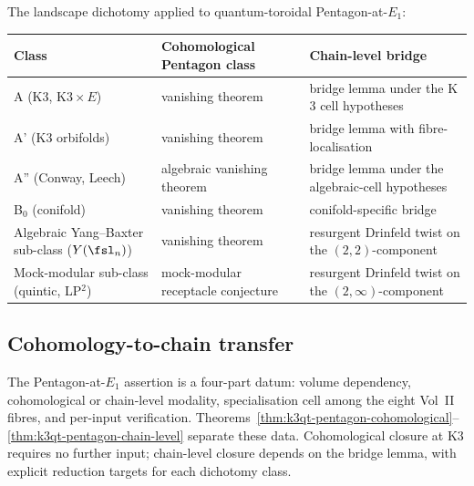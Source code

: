 \begin{remark}
\label{rem:k3qt-per-class-pentagon-comparison}
The landscape dichotomy applied to quantum-toroidal Pentagon-at-$E_1$:

\begin{center}
\small
\begin{tabular}{p{}p{}p{}}
\toprule
Class & Cohomological Pentagon class & Chain-level bridge \\
\midrule
A (K$3$, K$3 \times E$) & vanishing theorem & bridge lemma under the K$3$ cell hypotheses \\
A' (K$3$ orbifolds) & vanishing theorem & bridge lemma with fibre-localisation \\
A'' (Conway, Leech) & algebraic vanishing theorem & bridge lemma under the algebraic-cell hypotheses \\
B$_0$ (conifold) & vanishing theorem & conifold-specific bridge \\
Algebraic Yang--Baxter sub-class ($Y(\fsl_n)$) & vanishing theorem & resurgent Drinfeld twist on the $(2, 2)$-component \\
Mock-modular sub-class (quintic, LP$^2$) & mock-modular receptacle conjecture & resurgent Drinfeld twist on the $(2, \infty)$-component \\
\bottomrule
\end{tabular}
\end{center}
\end{remark}

\subsection{Cohomology-to-chain transfer}
\label{subsec:k3qt-discipline}

\begin{remark}
\label{rem:k3qt-cohom-vs-chain-discipline}
The Pentagon-at-$E_1$ assertion is a four-part datum: volume
dependency, cohomological or chain-level modality, specialisation cell
among the eight Vol~II fibres, and per-input verification.
Theorems~\ref{thm:k3qt-pentagon-cohomological}--\ref{thm:k3qt-pentagon-chain-level}
separate these data. Cohomological closure at K$3$ requires no further
input; chain-level closure depends on the bridge lemma, with explicit
reduction targets for each dichotomy class.
\end{remark}

